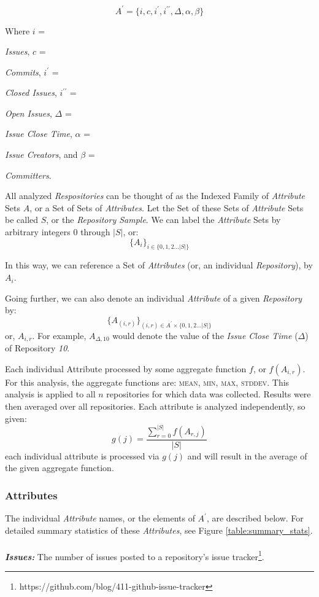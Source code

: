 \documentclass{proc}
\begin{document}
\[A^\prime = \{i, c, i^\prime, i^{\prime\prime}, \Delta, \alpha, \beta\}\]

Where $i$ = {\textit{Issues}, $c$ = {\textit{Commits}, $i^\prime$ = {\textit{Closed Issues}, $i^{\prime\prime}$ = {\textit{Open Issues}, $\Delta$ = {\textit{Issue Close Time}, $\alpha$ = {\textit{Issue Creators}, and $\beta$ = {\textit{Committers}.

All analyzed \textit{Respositories} can be thought of as the Indexed Family of \textit{Attribute} Sets $A$, or a Set of Sets of \textit{Attributes}. Let the Set of these Sets of \textit{Attribute} Sets be called $S$, or the \textit{Repository Sample}. We can label the \textit{Attribute} Sets by arbitrary integers 0 through $|S|$, or:
\[ \{A_i\}_{i \in \{0,1,2 ... |S|\} }\]

In this way, we can reference a Set of \textit{Attributes} (or, an individual \textit{Repository}), by $A_i$. 

Going further, we can also denote an individual \textit{Attribute} of a given \textit{Repository} by:
\[ \{A_{(i,r)}\}_{(i,r) \in A^\prime \times \{0,1,2 ... |S|\} } \]
or, $A_{i,r}$. For example, $A_{\Delta,10}$ would denote the value of the \textit{Issue Close Time} ($\Delta$) of Repository \textit{10}.

Each individual Attribute processed by some aggregate function $f$, or $f(  A_{i,r} )$. For this analysis, the aggregate functions are: \textsc{mean}, \textsc{min}, \textsc{max}, \textsc{stddev}. This analysis is applied to all $n$ repositories for which data was collected. Results were then averaged over all repositories. Each attribute is analyzed independently, so given:
\[ g(j) = \frac{\sum\limits_{r = 0}^{|S|} f(  A_{r,j}  ) }{|S|} \]
each individual attribute is processed via $g(j)$ and will result in the average of the given aggregate function.

\subsubsection{Attributes}
\label{sec:attributes}
The individual \textit{Attribute} names, or the elements of $A^\prime$, are described below. For detailed summary statistics of these \textit{Attributes}, see Figure  \ref{table:summary_stats}.\\\\
\noindent \textbf{\textit{Issues:}}
The number of issues posted to a repository's issue tracker\footnote{https://github.com/blog/411-github-issue-tracker}.

}}}}}}}
\end{document}
